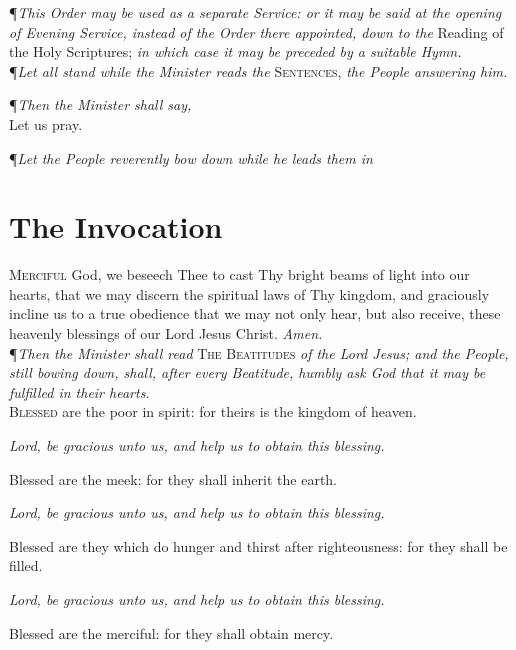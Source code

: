 \P\textit{This Order may be used as a separate Service: or it may be said at the opening of Evening Service, instead of the Order there appointed, down to the} Reading of the Holy Scriptures; \textit{in which case it may be preceded by a suitable Hymn.} \\

\noindent\P\textit{Let all stand while the Minister reads the} \textsc{Sentences,} \textit{the People answering him.} \\


{\centering \P\textit{Then the Minister shall say,} \\ Let us pray. \par}
\vspace{1ex}
\noindent\P\textit{Let the People reverently bow down while he leads them in}

\section*{The Invocation}

\lettrine{M}{erciful} God, we beseech Thee to cast Thy bright beams of light into our hearts, that we may discern the spiritual laws of Thy kingdom, and graciously incline us to a true obedience that we may not only hear, but also receive, these heavenly blessings of our Lord Jesus Christ.
\textit{Amen.} \\

\noindent\P\textit{Then the Minister shall read} \textsc{The Beatitudes} \textit{of the Lord Jesus; and the People, still bowing down, shall, after every Beatitude, humbly ask God that it may be fulfilled in their hearts.} \\

\noindent\lettrine{B}{lessed} are the poor in spirit: for theirs is the kingdom of heaven.

\textit{Lord, be gracious unto us, and help us to obtain this blessing.}   

Blessed are the meek: for they shall inherit the earth.

\textit{Lord, be gracious unto us, and help us to obtain this blessing.}   

Blessed are they which do hunger and thirst after righteousness: for they shall be filled.

\textit{Lord, be gracious unto us, and help us to obtain this blessing.}   

Blessed are the merciful: for they shall obtain mercy.

